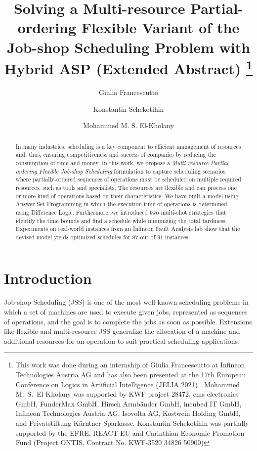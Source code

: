 \documentclass[submission,copyright,creativecommons]{eptcs}
\title{Solving a Multi-resource Partial-ordering Flexible Variant of the Job-shop Scheduling Problem with Hybrid ASP (Extended Abstract) \thanks{This work was done during an internship of Giulia Francescutto at Infineon Technologies Austria AG and has also been presented at the 17th European Conference on Logics in Artificial Intelligence (JELIA 2021) \cite{frscel21a}.
Mohammed M.\ S.\ El-Kholany was supported by
KWF project 28472,
cms electronics GmbH,
FunderMax GmbH,
Hirsch Armbänder GmbH,
incubed IT GmbH,
Infineon Technologies Austria AG,
Isovolta AG,
Kostwein Holding GmbH, and
Privatstiftung Kärntner Sparkasse. Konstantin Schekotihin was partially supported by the EFRE, REACT-EU and Carinthian Economic Promotion Fund (Project ONTIS, Contract No. KWF-3520 34826 50900)}}
\author{Giulia Francescutto
\institute{Siemens AG {\"O}sterreich, Vienna, Austria}
\email{giulia.francescutto@siemens.com}
\and
Konstantin Schekotihin
\institute{University of Klagenfurt,
Klagenfurt, Austria}
\email{konstantin.schekotihin@aau.at}
\and
Mohammed M. S. El-Kholany
\institute{University of Klagenfurt, Klagenfurt, Austria}
\institute{Cairo University, Cairo, Egypt}
\email{mohammed.el-kholany@aau.at}
}
\newcommand{\jss}{MPF-JSS\xspace}
\begin{document}
\maketitle

\begin{abstract}
  In many industries, scheduling is a key component to efficient management of resources and, thus, ensuring competitiveness and success of companies by reducing the consumption of time and money. In this work, we propose a \emph{Multi-resource Partial-ordering Flexible Job-shop Scheduling} %
  formulation to capture scheduling scenarios where partially-ordered sequences of operations must be scheduled on multiple required resources, such as tools and specialists.
  The resources are flexible and can process one or more kind of operations based on their characteristics. We have built a model using Answer Set Programming %
  in which the execution time of operations is determined using Difference Logic. Furthermore, we introduced two multi-shot strategies that identify the time bounds and find a schedule while minimizing the total tardiness. 
  Experiments on real-world %
  instances from an Infineon Fault Analysis lab %
  show that the devised model %
  yields optimized schedules for $87$ out of $91$ %
  instances.
\end{abstract}

\section{Introduction}
Job-shop Scheduling (JSS) \cite{johnson1954optimal} is one of the most well-known scheduling problems in which a set of machines are used to execute given jobs, represented as sequences of operations, and the goal is to complete the jobs as soon as possible.
Extensions like flexible \cite{brucker1990job} and multi-resource
\cite{DBLP:journals/eor/Dauzere-PeresRL98} JSS
generalize the allocation of a machine and additional resources for an operation
to suit practical scheduling applications.
\end{document}
